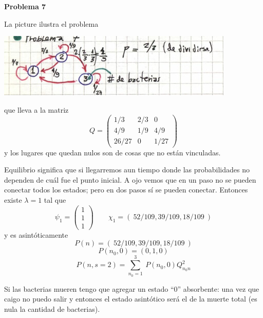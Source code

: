 \documentclass[10pt,oneside]{CBFT_book}
\begin{document}
\begin{ejemplo}{\bf Problema 7}

La picture ilustra el problema

\includegraphics[scale=0.5]{images/1606329257.jpg}

que lleva a la matriz
\[
	Q = \begin{pmatrix}
		1/3 & 2/3 & 0 \\
		4/9 & 1/9 & 4/9 \\
		26/27 & 0 & 1/27 
	    \end{pmatrix}
\]
y los lugares que quedan nulos son de cosas que no están vinculadas.

Equilibrio significa que si llegarremos aun tiempo donde las probabilidades no dependen de
cuál fue el punto inicial. A ojo vemos que en un paso no se pueden conectar todos los
estados; pero en dos pasos sí se pueden conectar. Entonces existe $ \lambda = 1 $ tal que
\[
	\psi_1 = \begin{pmatrix}
	          1 \\
	          1 \\
	          1
	         \end{pmatrix}
	\qquad 
	\chi_1 = ( \: 52/109, 39/109, 18/109 \:)
\]
y es asintóticamente
\[
	P(n) = ( \: 52/109, 39/109, 18/109 \:)
\]
\[
	P(n_0,0) = (0,1,0)
\]
\[
	P(n,s=2) = \sum_{n_0=1}^3 \: P(n_0,0) Q_{n_0 n}^2 
\]

Si las bacterias mueren tengo que agregar un estado ``0'' absorbente: una vez que caigo no
puedo salir y entonces el estado asintótico será el de la muerte total (es nula la cantidad
de bacterias).
 
\end{ejemplo}
\end{document}
